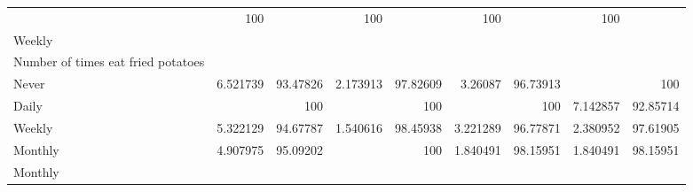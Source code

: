 \documentclass{article}
\begin{document}
\begin{tabular}{lllllllll}
  \multicolumn{1}{|r}{} &
  \multicolumn{1}{r}{100} &
  \multicolumn{1}{r}{} &
  \multicolumn{1}{r}{100} &
  \multicolumn{1}{r}{} &
  \multicolumn{1}{r}{100} &
  \multicolumn{1}{r}{} &
  \multicolumn{1}{r}{100} \\
\multicolumn{1}{l}{\hspace{5em}Weekly} &
  \multicolumn{1}{|r}{} &
  \multicolumn{1}{r}{} &
  \multicolumn{1}{r}{} &
  \multicolumn{1}{r}{} &
  \multicolumn{1}{r}{} &
  \multicolumn{1}{r}{} &
  \multicolumn{1}{r}{} &
  \multicolumn{1}{r}{} \\
\multicolumn{1}{l}{\hspace{6em}Number of times eat fried potatoes} &
  \multicolumn{1}{|r}{} &
  \multicolumn{1}{r}{} &
  \multicolumn{1}{r}{} &
  \multicolumn{1}{r}{} &
  \multicolumn{1}{r}{} &
  \multicolumn{1}{r}{} &
  \multicolumn{1}{r}{} &
  \multicolumn{1}{r}{} \\
\multicolumn{1}{l}{\hspace{7em}Never} &
  \multicolumn{1}{|r}{6.521739} &
  \multicolumn{1}{r}{93.47826} &
  \multicolumn{1}{r}{2.173913} &
  \multicolumn{1}{r}{97.82609} &
  \multicolumn{1}{r}{3.26087} &
  \multicolumn{1}{r}{96.73913} &
  \multicolumn{1}{r}{} &
  \multicolumn{1}{r}{100} \\
\multicolumn{1}{l}{\hspace{7em}Daily} &
  \multicolumn{1}{|r}{} &
  \multicolumn{1}{r}{100} &
  \multicolumn{1}{r}{} &
  \multicolumn{1}{r}{100} &
  \multicolumn{1}{r}{} &
  \multicolumn{1}{r}{100} &
  \multicolumn{1}{r}{7.142857} &
  \multicolumn{1}{r}{92.85714} \\
\multicolumn{1}{l}{\hspace{7em}Weekly} &
  \multicolumn{1}{|r}{5.322129} &
  \multicolumn{1}{r}{94.67787} &
  \multicolumn{1}{r}{1.540616} &
  \multicolumn{1}{r}{98.45938} &
  \multicolumn{1}{r}{3.221289} &
  \multicolumn{1}{r}{96.77871} &
  \multicolumn{1}{r}{2.380952} &
  \multicolumn{1}{r}{97.61905} \\
\multicolumn{1}{l}{\hspace{7em}Monthly} &
  \multicolumn{1}{|r}{4.907975} &
  \multicolumn{1}{r}{95.09202} &
  \multicolumn{1}{r}{} &
  \multicolumn{1}{r}{100} &
  \multicolumn{1}{r}{1.840491} &
  \multicolumn{1}{r}{98.15951} &
  \multicolumn{1}{r}{1.840491} &
  \multicolumn{1}{r}{98.15951} \\
\multicolumn{1}{l}{\hspace{5em}Monthly} &
  \multicolumn{1}{|r}{} &
  \multicolumn{1}{r}{} &
  \multicolumn{1}{r}{} &
  \multicolumn{1}{r}{} &
  \multicolumn{1}{r}{} &

\end{tabular}
\end{document}
